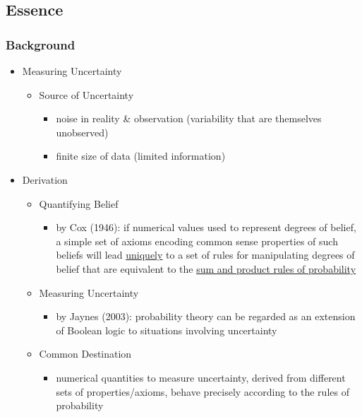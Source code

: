 \subsection{Essence}
\subsubsection{Background}
\begin{itemize}
\item Measuring Uncertainty
	\begin{itemize}
	\item Source of Uncertainty
		\begin{itemize}
		\item noise in reality \& observation (variability that are themselves unobserved)
		\item finite size of data (limited information)
		\end{itemize}
	\end{itemize}
\item Derivation
	\begin{itemize}
	\item Quantifying Belief
		\begin{itemize}
		\item by Cox (1946): if numerical values used to
		represent degrees of belief, a simple set of axioms encoding common sense
		properties of such beliefs will lead \underline{uniquely} to a set of rules for manipulating degrees of
		belief that are equivalent to the \underline{sum and product rules of probability}
		\end{itemize}
	\item Measuring Uncertainty
		\begin{itemize}
		\item by Jaynes (2003): probability theory can be regarded as an extension of
		Boolean logic to situations involving uncertainty
		\end{itemize}
	\item Common Destination
		\begin{itemize}
		\item numerical quantities to measure uncertainty, derived from different sets of properties/axioms, behave precisely according to the rules of probability
		\end{itemize}
	\end{itemize}
\end{itemize}


